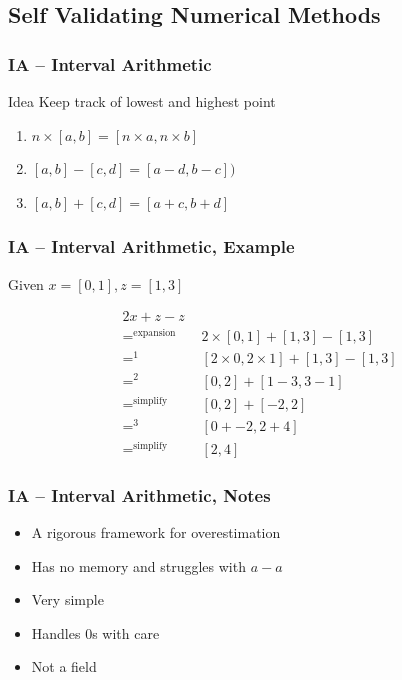 \documentclass{beamer}
\begin{document}
\subsection{Self Validating Numerical Methods}

\begin{frame}
\frametitle{IA -- Interval Arithmetic}

\begin{block}{Idea}
Keep track of lowest and highest point
\end{block}

\begin{center}
\begin{enumerate}
  \item $n \times [a, b] = [n \times a, n \times b]$
  \item $[a, b] - [c, d] = [a - d, b - c])$
  \item $[a, b] + [c, d] = [a + c, b + d]$
\end{enumerate}
\end{center}
\end{frame}

\begin{frame}
\frametitle{IA -- Interval Arithmetic, Example}

Given $x = [0, 1], z = [1, 3]$
\begin{center}
\begin{align*}
  2x + z - z \\
  =^{\text{expansion}} \quad & 2 \times [0, 1] + [1, 3] - [1, 3] \\
  =^{1}                \quad & [2 \times 0, 2 \times 1] + [1, 3] - [1, 3] \\
  =^{2}                \quad & [0, 2] + [1 - 3, 3 - 1] \\
  =^{\text{simplify}}  \quad & [0, 2] + [-2, 2] \\
  =^{3}                \quad & [0 + -2, 2 + 4] \\
  =^{\text{simplify}}  \quad & [2, 4]
\end{align*}
\end{center}
\end{frame}

\begin{frame}
\frametitle{IA -- Interval Arithmetic, Notes}

\begin{itemize}
  \item A rigorous framework for overestimation
  \item Has no memory and struggles with $a - a$
  \item Very simple
  \item Handles 0s with care
  \item Not a field
\end{itemize}
\end{frame}
\end{document}
